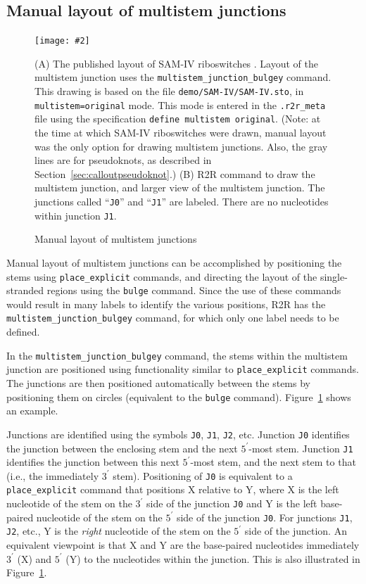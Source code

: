 \documentclass[letterpaper,12pt]{report}
\newcommand{\fig}[4]{
\begin{figure}
\texttt{[image: \#2]}
\caption{#3}

\begin{small}
#4
\end{small}
\label{#1}
\end{figure}
}
\begin{document}
\subsection{Manual layout of multistem junctions}
\fig{fig:multistemmanual}{figures/multistem-manual.pdf}{Manual layout of multistem junctions}{
(A)
The published layout of SAM-IV riboswitches \cite{SAMIV}.  Layout of the multistem junction uses the
{\tt multistem\_junction\_bulgey} command.
This drawing is based on the file {\tt demo/SAM-IV/SAM-IV.sto}, in {\tt multistem=original} mode.  This mode is entered in the {\tt .r2r\_meta} file using the specification {\tt define multistem original}.
(Note: at the time at which SAM-IV riboswitches were drawn, manual layout was the only option for drawing multistem junctions.
Also, the gray lines are for pseudoknots, as described in Section~\ref{sec:calloutpseudoknot}.)
(B)
R2R command to draw the multistem junction, and larger view of the multistem junction.
The junctions called ``{\tt J0}'' and ``{\tt J1}'' are labeled.  There are no nucleotides
within junction {\tt J1}.
}
Manual layout of multistem junctions can be accomplished by positioning
the stems using {\tt place\_explicit} commands, and directing the layout of the single-stranded
regions using the {\tt bulge} command.  Since the use of these commands would result in many labels to identify the various positions,
R2R has the {\tt multistem\_junction\_bulgey} command, for which only one label needs to be defined.

In the {\tt multistem\_junction\_bulgey} command, the stems within the multistem junction are positioned
using functionality similar to {\tt place\_explicit} commands.  The junctions are then positioned automatically
between the stems by positioning them on circles (equivalent to the {\tt bulge} command).
Figure~\ref{fig:multistemmanual} shows an example.

Junctions are identified using the symbols {\tt J0}, {\tt J1}, {\tt J2}, etc.
Junction {\tt J0} identifies the junction between the enclosing stem and the next $5^\prime$-most stem.
Junction {\tt J1} identifies the junction between this next $5^\prime$-most stem, and the next stem to that (i.e.,
the immediately $3^\prime$ stem).
Positioning of {\tt J0} is equivalent to a {\tt place\_explicit} command that positions X relative to Y,
where X is the left nucleotide of the stem on the $3^\prime$ side of the junction {\tt J0} and Y is the 
left base-paired nucleotide of the stem on the $5^\prime$ side of the junction {\tt J0}.
For junctions {\tt J1}, {\tt J2}, etc., Y is the {\em right} nucleotide of the stem on the $5^\prime$ side of the junction.
An equivalent viewpoint is that X and Y are the base-paired nucleotides immediately $3^\prime$ (X) and $5^\prime$ (Y)
to the nucleotides within the junction.
This is also illustrated in Figure~\ref{fig:multistemmanual}.
\end{document}
